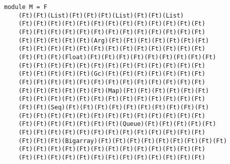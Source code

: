 \documentclass[a4paper,11pt]{beamer}
\begin{document}
  \begin{frame}[fragile]
  \begin{verbatim}
module M = F
    (Ft)(Ft)(List)(Ft)(Ft)(Ft)(List)(Ft)(Ft)(List)
    (Ft)(Ft)(Ft)(Ft)(Ft)(Ft)(Ft)(Ft)(Ft)(Ft)(Ft)(Ft)(Ft)
    (Ft)(Ft)(Ft)(Ft)(Ft)(Ft)(Ft)(Ft)(Ft)(Ft)(Ft)(Ft)(Ft)
    (Ft)(Ft)(Ft)(Ft)(Ft)(Arg)(Ft)(Ft)(Ft)(Ft)(Ft)(Ft)(Ft)
    (Ft)(Ft)(Ft)(Ft)(Ft)(Ft)(Ft)(Ft)(Ft)(Ft)(Ft)(Ft)(Ft)
    (Ft)(Ft)(Ft)(Float)(Ft)(Ft)(Ft)(Ft)(Ft)(Ft)(Ft)(Ft)(Ft)
    (Ft)(Ft)(Ft)(Ft)(Ft)(Ft)(Ft)(Ft)(Ft)(Ft)(Ft)(Ft)(Ft)
    (Ft)(Ft)(Ft)(Ft)(Ft)(Gc)(Ft)(Ft)(Ft)(Ft)(Ft)(Ft)(Ft)
    (Ft)(Ft)(Ft)(Ft)(Ft)(Ft)(Ft)(Ft)(Ft)(Ft)(Ft)(Ft)(Ft)
    (Ft)(Ft)(Ft)(Ft)(Ft)(Ft)(Map)(Ft)(Ft)(Ft)(Ft)(Ft)(Ft)
    (Ft)(Ft)(Ft)(Ft)(Ft)(Ft)(Ft)(Ft)(Ft)(Ft)(Ft)(Ft)(Ft)
    (Ft)(Ft)(Seq)(Ft)(Ft)(Ft)(Ft)(Ft)(Ft)(Ft)(Ft)(Ft)(Ft)
    (Ft)(Ft)(Ft)(Ft)(Ft)(Ft)(Ft)(Ft)(Ft)(Ft)(Ft)(Ft)(Ft)
    (Ft)(Ft)(Ft)(Ft)(Ft)(Ft)(Ft)(Queue)(Ft)(Ft)(Ft)(Ft)(Ft)
    (Ft)(Ft)(Ft)(Ft)(Ft)(Ft)(Ft)(Ft)(Ft)(Ft)(Ft)(Ft)(Ft)
    (Ft)(Ft)(Ft)(Bigarray)(Ft)(Ft)(Ft)(Ft)(Ft)(Ft)(Ft)(Ft)(Ft)
    (Ft)(Ft)(Ft)(Ft)(Ft)(Ft)(Ft)(Ft)(Ft)(Ft)(Ft)(Ft)(Ft)
    (Ft)(Ft)(Ft)(Ft)(Ft)(Ft)(Ft)(Ft)(Ft)(Ft)(Ft)(Ft)(Ft)
\end{verbatim}
\end{frame}
\end{document}
